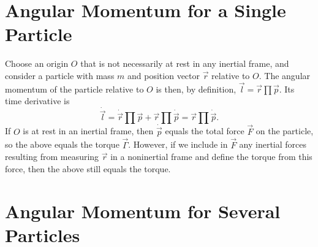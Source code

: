 \documentclass[article, a4paper, 11pt, oneside]{memoir}
\numberwithin{equation}{chapter}
\begin{document}
\section{Angular Momentum for a Single Particle}

\begin{remarkbreak}
    Choose an origin $O$ that is not necessarily at rest in any inertial frame, and consider a particle with mass $m$ and position vector $\vec{r}$ relative to $O$. The angular momentum of the particle relative to $O$ is then, by definition, $\vec{l} = \vec{r} \prod \vec{p}$. Its time derivative is
    \begin{equation*}
        \dot{\vec{l}}
            = \dot{\vec{r}} \prod \vec{p} + \vec{r} \prod \dot{\vec{p}}
            = \vec{r} \prod \dot{\vec{p}}.
    \end{equation*}
    If $O$ is at rest in an inertial frame, then $\dot{\vec{p}}$ equals the total force $\vec{F}$ on the particle, so the above equals the torque $\vec{\Gamma}$. However, if we include in $\vec{F}$ any inertial forces resulting from measuring $\vec{r}$ in a noninertial frame and define the torque from this force, then the above still equals the torque.
\end{remarkbreak}


\section{Angular Momentum for Several Particles}

\newcommand{\CM}{\mathrm{CM}}
\end{document}
